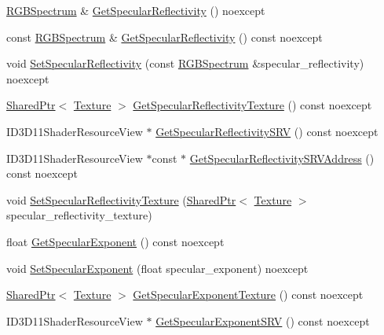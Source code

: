 \begin{DoxyCompactItemize}
\item 
\hyperlink{structmage_1_1_r_g_b_spectrum}{R\+G\+B\+Spectrum} \& \hyperlink{structmage_1_1_shaded_material_aa13cf6b1af3568471ebd0f93a0bc08ac}{Get\+Specular\+Reflectivity} () noexcept
\item 
const \hyperlink{structmage_1_1_r_g_b_spectrum}{R\+G\+B\+Spectrum} \& \hyperlink{structmage_1_1_shaded_material_a7655315b6654ee4f6f34ac2489ee6f92}{Get\+Specular\+Reflectivity} () const noexcept
\item 
void \hyperlink{structmage_1_1_shaded_material_aa31a28ef31f98adf3ccf1fa83e6db9fb}{Set\+Specular\+Reflectivity} (const \hyperlink{structmage_1_1_r_g_b_spectrum}{R\+G\+B\+Spectrum} \&specular\+\_\+reflectivity) noexcept
\item 
\hyperlink{namespacemage_a1e01ae66713838a7a67d30e44c67703e}{Shared\+Ptr}$<$ \hyperlink{classmage_1_1_texture}{Texture} $>$ \hyperlink{structmage_1_1_shaded_material_aabf7fea125dfdf4d97537f22e0003a9e}{Get\+Specular\+Reflectivity\+Texture} () const noexcept
\item 
I\+D3\+D11\+Shader\+Resource\+View $\ast$ \hyperlink{structmage_1_1_shaded_material_a5ea5b4ad3100a2a625b2849ba142cdd6}{Get\+Specular\+Reflectivity\+S\+RV} () const noexcept
\item 
I\+D3\+D11\+Shader\+Resource\+View $\ast$const  $\ast$ \hyperlink{structmage_1_1_shaded_material_a49e9f7f63c8bdbf471811e0a1d161340}{Get\+Specular\+Reflectivity\+S\+R\+V\+Address} () const noexcept
\item 
void \hyperlink{structmage_1_1_shaded_material_a8bd9bf0a0b1f636a74d3452c58b5b98d}{Set\+Specular\+Reflectivity\+Texture} (\hyperlink{namespacemage_a1e01ae66713838a7a67d30e44c67703e}{Shared\+Ptr}$<$ \hyperlink{classmage_1_1_texture}{Texture} $>$ specular\+\_\+reflectivity\+\_\+texture)
\item 
float \hyperlink{structmage_1_1_shaded_material_adb859615bf3461e9554e91550860d588}{Get\+Specular\+Exponent} () const noexcept
\item 
void \hyperlink{structmage_1_1_shaded_material_ae9c4286f2802a30698863c9abe95e60d}{Set\+Specular\+Exponent} (float specular\+\_\+exponent) noexcept
\item 
\hyperlink{namespacemage_a1e01ae66713838a7a67d30e44c67703e}{Shared\+Ptr}$<$ \hyperlink{classmage_1_1_texture}{Texture} $>$ \hyperlink{structmage_1_1_shaded_material_a0d1d76e70949caf33e30aa474882b364}{Get\+Specular\+Exponent\+Texture} () const noexcept
\item 
I\+D3\+D11\+Shader\+Resource\+View $\ast$ \hyperlink{structmage_1_1_shaded_material_abae39d873aab545a59d1b611cf9b2025}{Get\+Specular\+Exponent\+S\+RV} () const noexcept

\end{DoxyCompactItemize}
